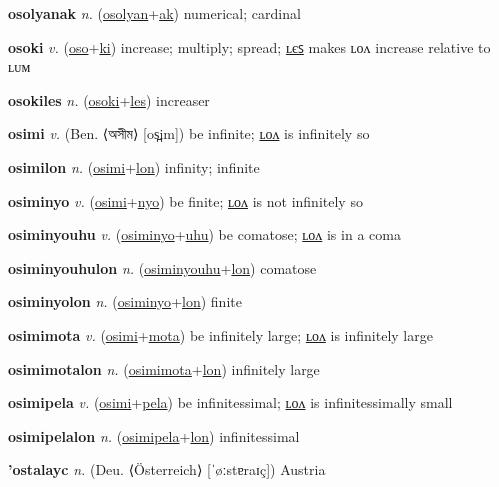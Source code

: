 \textbf{\hypertarget{osolyanak}{osolyanak}} \textit{n.} (\hyperlink{osolyan}{osolyan}+\allowbreak \hyperlink{ak}{ak})
numerical; cardinal

\textbf{\hypertarget{osoki}{osoki}} \textit{v.} (\hyperlink{oso}{oso}+\allowbreak \hyperlink{ki}{ki})
increase; multiply; spread; \hyperlink{osokiles}{ʟєꜱ} makes ʟᴏᴧ increase relative to ʟᴜᴍ

\textbf{\hypertarget{osokiles}{osokiles}} \textit{n.} (\hyperlink{osoki}{osoki}+\allowbreak \hyperlink{les}{les})
increaser

\textbf{\hypertarget{osimi}{osimi}} \textit{v.} (Ben. ⟨{\bengali{}অসীম}⟩ [os̪im])
be infinite; \hyperlink{osimilon}{ʟᴏᴧ} is infinitely so

\textbf{\hypertarget{osimilon}{osimilon}} \textit{n.} (\hyperlink{osimi}{osimi}+\allowbreak \hyperlink{lon}{lon})
infinity; infinite

\textbf{\hypertarget{osiminyo}{osiminyo}} \textit{v.} (\hyperlink{osimi}{osimi}+\allowbreak \hyperlink{nyo}{nyo})
be finite; \hyperlink{osiminyolon}{ʟᴏᴧ} is not infinitely so

\textbf{\hypertarget{osiminyouhu}{osiminyouhu}} \textit{v.} (\hyperlink{osiminyo}{osiminyo}+\allowbreak \hyperlink{uhu}{uhu})
be comatose; \hyperlink{osiminyouhulon}{ʟᴏᴧ} is in a coma

\textbf{\hypertarget{osiminyouhulon}{osiminyouhulon}} \textit{n.} (\hyperlink{osiminyouhu}{osiminyouhu}+\allowbreak \hyperlink{lon}{lon})
comatose

\textbf{\hypertarget{osiminyolon}{osiminyolon}} \textit{n.} (\hyperlink{osiminyo}{osiminyo}+\allowbreak \hyperlink{lon}{lon})
finite

\textbf{\hypertarget{osimimota}{osimimota}} \textit{v.} (\hyperlink{osimi}{osimi}+\allowbreak \hyperlink{mota}{mota})
be infinitely large; \hyperlink{osimimotalon}{ʟᴏᴧ} is infinitely large

\textbf{\hypertarget{osimimotalon}{osimimotalon}} \textit{n.} (\hyperlink{osimimota}{osimimota}+\allowbreak \hyperlink{lon}{lon})
infinitely large

\textbf{\hypertarget{osimipela}{osimipela}} \textit{v.} (\hyperlink{osimi}{osimi}+\allowbreak \hyperlink{pela}{pela})
be infinitessimal; \hyperlink{osimipelalon}{ʟᴏᴧ} is infinitessimally small

\textbf{\hypertarget{osimipelalon}{osimipelalon}} \textit{n.} (\hyperlink{osimipela}{osimipela}+\allowbreak \hyperlink{lon}{lon})
infinitessimal

\textbf{\hypertarget{'ostalayc}{'ostalayc}} \textit{n.} (Deu. ⟨Österreich⟩ [ˈøːstɐraɪç])
Austria

